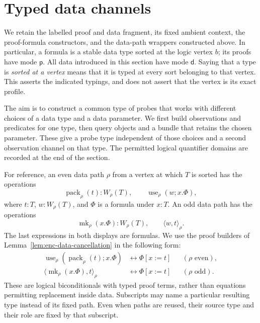 \section{Typed data channels}
\label{chan-section}

We retain the labelled proof and data fragment, its fixed ambient context,
the proof-formula constructors, and the data-path wrappers constructed
above.  In particular, a formula is a stable data type sorted at the logic
vertex $b$; its proofs have mode $\mathsf p$.  All data introduced in this
section have mode $\mathsf d$.  Saying that a type is \emph{sorted at a
vertex} means that it is typed at every sort belonging to that vertex.  This
asserts the indicated typings, and does not assert that the vertex is its
exact profile.

The aim is to construct a common type of probes that works with different
choices of a data type and a data parameter. We first build observations
and predicates for one type, then query objects and a bundle that retains
the chosen parameter. These give a probe type independent of those
choices and a second observation channel on that type. The permitted
logical quantifier domains are recorded at the end of the section.

For reference, an even data path $\rho$ from a vertex at which $T$ is sorted
has the operations
\[
 \operatorname{pack}_{\rho}(t):W_{\rho}(T),\qquad
 \operatorname{use}_{\rho}(w;x.\Phi),
\]
where $t:T$, $w:W_{\rho}(T)$, and $\Phi$ is a formula under $x:T$.
An odd data path has the operations
\[
 \operatorname{mk}_{\rho}(x.\Phi):W_{\rho}(T),\qquad
 \langle w,t\rangle_{\rho}.
\]
The last expressions in both displays are formulas.  We use the proof
builders of Lemma~\ref{lem:enc-data-cancellation} in the following form:
\begin{equation}
\begin{aligned}
 \operatorname{use}_{\rho}(\operatorname{pack}_{\rho}(t);x.\Phi)
       &\leftrightarrow \Phi[x:=t] &&(\rho\text{ even}),\\
 \langle\operatorname{mk}_{\rho}(x.\Phi),t\rangle_{\rho}
       &\leftrightarrow \Phi[x:=t] &&(\rho\text{ odd}).
\end{aligned}
\label{chan-cancellation}
\end{equation}
These are logical biconditionals with typed proof terms, rather than
equations permitting replacement inside data.  Subscripts may name a
particular resulting type instead of its fixed path.  Even when paths are
reused, their source type and their role are fixed by that subscript.

